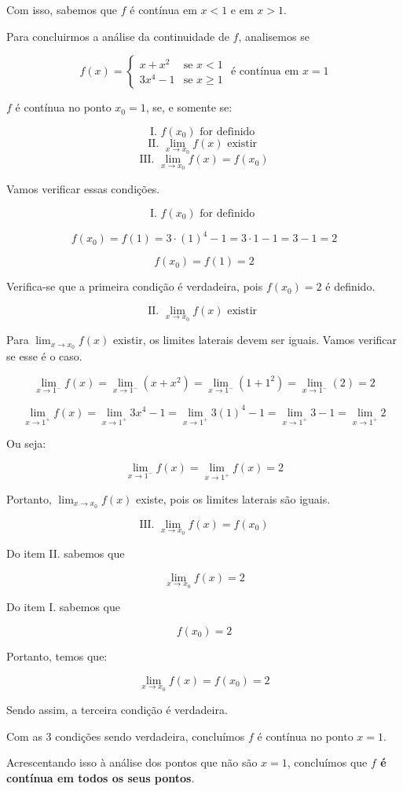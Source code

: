 \documentclass{article}
\begin{document}
Com isso, sabemos que \(f\) é contínua em \(x < 1\) e em \(x > 1\).

Para concluirmos a análise da continuidade de \(f\), analisemos se

\[
    f(x) =
    \left\{
    \begin{array}{ll}
        x + x^2  & \mbox{se } x < 1     \\
        3x^4 - 1 & \mbox{se } x \geq  1
    \end{array}
    \right. \text{ é contínua em } x = 1
\]

\(f\) é contínua no ponto \(x_0 = 1\), se, e somente se:


\[\text{I. } f(x_0) \text{ for definido }\]
\[\text{II. } \lim_{x \to x_0} f(x) \text{ existir }\]
\[\text{III. } \lim_{x \to x_0} f(x) = f(x_0)\]


Vamos verificar essas condições.


\[\text{I. } f(x_0) \text{ for definido }\]



\[
    f(x_0) = f(1) = 3 \cdot (1)^4 - 1 = 3 \cdot 1 - 1 = 3 - 1 = 2
\]

\[
    f(x_0) = f(1)  = 2
\]

Verifica-se que a primeira condição é verdadeira, pois \(f(x_0) = 2\) é definido.

\[
    \text{II. }
    \lim_{x \to x_0} f(x) \text{ existir }
\]



Para \(\lim_{x \to x_0} f(x)\) existir, os limites laterais devem ser iguais.
Vamos verificar se esse é o caso.

\[
    \lim_{x \to 1^-} f(x)
    = \lim_{x \to 1^-} (x + x^2)
    = \lim_{x \to 1^-} (1 + 1^2)
    = \lim_{x \to 1^-} (2)
    = 2
\]

\[
    \lim_{x \to 1^+} f(x)
    = \lim_{x \to 1^+} 3x^4 - 1
    = \lim_{x \to 1^+} 3(1)^4 - 1
    = \lim_{x \to 1^+} 3 - 1
    = \lim_{x \to 1^+} 2
\]

Ou seja:

\[
    \lim_{x \to 1^-} f(x) = \lim_{x \to 1^+} f(x) = 2
\]

Portanto, \(\lim_{x \to x_0} f(x)\) existe, pois os limites laterais são iguais.


\[
    \text{III. } \lim_{x \to x_0} f(x) = f(x_0)
\]


Do item II. sabemos que

\[
    \lim_{x \to x_0} f(x) = 2
\]

Do item I. sabemos que

\[
    f(x_0)  = 2
\]

Portanto, temos que:

\[
    \lim_{x \to x_0} f(x) = f(x_0) = 2
\]

Sendo assim, a terceira condição é verdadeira.

Com as 3 condições sendo verdadeira, concluímos \(f\) é contínua no ponto \(x = 1\).

Acrescentando isso à análise dos pontos que não são \(x = 1\),
concluímos que \textbf{\(f\) é contínua em todos os seus pontos}.
\end{document}
